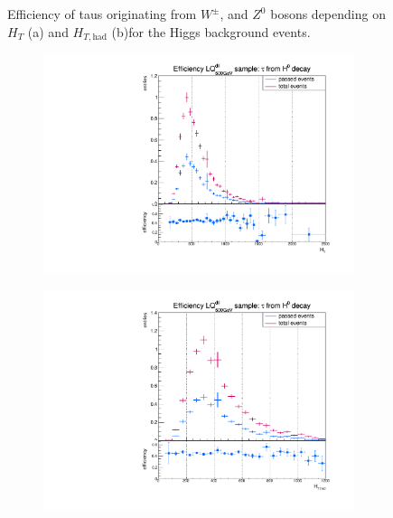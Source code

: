 \begin{figure}
\begin{subfigure}[t]{0.49\textwidth}
                \label{Divided:prompt:HThad}
                \end{subfigure}
\caption[Efficiency of taus originating from $W^\pm$, and $Z^0$ bosons for the Higgs background events.]{Efficiency of taus originating from $W^\pm$, and $Z^0$ bosons depending on $H_{T}$ (a) and $H_{T,\text{had}}$ (b)for the Higgs background events.}
\label{Divided:prompt:HTgedöns}
\end{figure}
%
\begin{figure}
  \centering
                \begin{subfigure}[t]{0.49\textwidth}
                \includegraphics[width=\textwidth]{figures/plots/ttH/Divided_fromHHT.pdf}
                \label{Divided:fromH:HT}
                \end{subfigure}
                \begin{subfigure}[t]{0.49\textwidth}
                \includegraphics[width=\textwidth]{figures/plots/ttH/Divided_fromHHThad.pdf}

\end{subfigure}
\end{figure}
